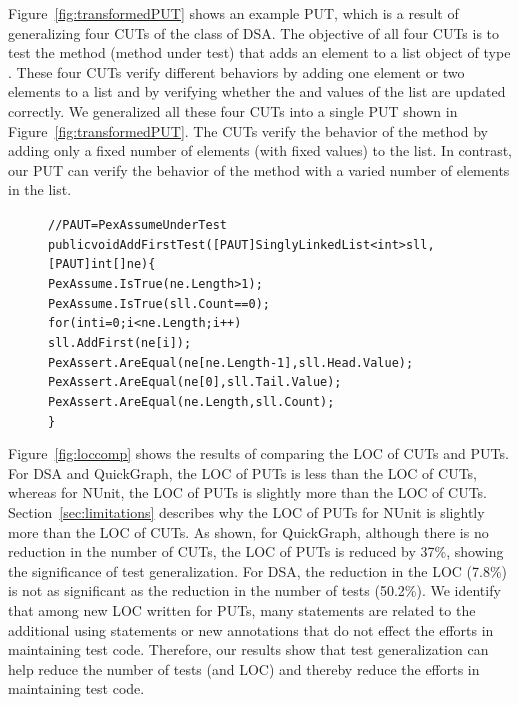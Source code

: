 Figure~\ref{fig:transformedPUT} shows an example PUT, which is a result of generalizing four CUTs of the  class of DSA. The objective of all four CUTs is to test the  method (method under test) that adds an element to a list object of type . These four CUTs verify different behaviors by adding one element or two elements to a list and by verifying whether the  and  values of the list are updated correctly. We generalized all these four CUTs into a single PUT shown in Figure~\ref{fig:transformedPUT}. The CUTs verify the behavior of the  method by adding only a fixed number of elements (with fixed values) to the list. In contrast, our PUT can verify the behavior of the  method with a varied number of elements in the list. 

\begin{figure}[t]
\begin{CodeOut}
\begin{alltt}
//PAUT = PexAssumeUnderTest
public void AddFirstTest([PAUT]SinglyLinkedList<int> sll, 
\hspace*{0.6in}[PAUT]int[] ne) \{            
\hspace*{0.2in}PexAssume.IsTrue(ne.Length > 1);
\hspace*{0.2in}PexAssume.IsTrue(sll.Count == 0);
\hspace*{0.2in}for (int i = 0; i < ne.Length; i++)
\hspace*{0.4in}sll.AddFirst(ne[i]);
\hspace*{0.2in}PexAssert.AreEqual(ne[ne.Length - 1], sll.Head.Value);            
\hspace*{0.2in}PexAssert.AreEqual(ne[0], sll.Tail.Value);
\hspace*{0.2in}PexAssert.AreEqual(ne.Length, sll.Count);
\}
\end{alltt}
\end{CodeOut}\vspace*{-5ex}
 \vspace*{-1ex}
\end{figure}

Figure~\ref{fig:loccomp} shows the results of comparing the LOC of CUTs and PUTs. For DSA and QuickGraph, the LOC of PUTs is less than the LOC of CUTs, whereas for NUnit, the LOC of PUTs is slightly more than the LOC of CUTs. Section~\ref{sec:limitations} describes why the LOC of PUTs for NUnit is slightly more than the LOC of CUTs. As shown, for QuickGraph, although there is no reduction in the number of CUTs, the LOC of PUTs is reduced by 37\%, showing the significance of test generalization. For DSA, the reduction in the LOC (7.8\%) is not as significant as the reduction in the number of tests (50.2\%). We identify that among new LOC written for PUTs, many statements are related to the additional using statements or new annotations that do not effect the efforts in maintaining test code. Therefore, our results show that test generalization can help reduce the number of tests (and LOC) and thereby reduce the efforts in maintaining test code.

